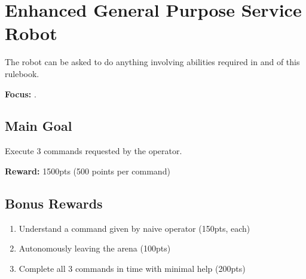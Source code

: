 \section{Enhanced General Purpose Service Robot}
\label{test:egpsr}
The robot can be asked to do anything involving abilities required in \SONE{} and \STWO{} of this rulebook.

\noindent \textbf{Focus:} \SysI{}.

\subsection*{Main Goal}
Execute 3 commands requested by the operator.

\noindent\textbf{Reward:} 1500pts (500 points per command)

\subsection*{Bonus Rewards}
\begin{enumerate}[nosep]
	\item Understand a command given by naive operator (150pts, each)
	\item Autonomously leaving the arena (100pts)
	\item Complete all 3 commands in time with minimal help (200pts)
\end{enumerate}

%
%
